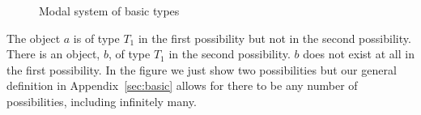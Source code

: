 \begin{figure}[h]
\begin{adjustbox}{max width=\textwidth}
\begin{tikzpicture}


    




    
\end{tikzpicture}
\end{adjustbox}

\caption{Modal system of basic types}
\label{fig:modal}
\end{figure}
The object $a$ is
of type $T_1$ in the first possibility but not in the second
possibility.  There is an object, $b$, of type $T_1$ in the second
possibility.  $b$ does not exist at all in the first possibility.
In the
figure we just show two possibilities but our general definition in Appendix~\ref{sec:basic}
allows for there to be any number of possibilities, including
infinitely many.

